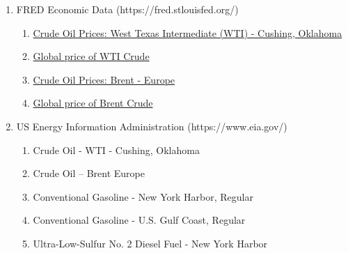 \documentclass[12pt,twoside]{article}
\begin{document}
\begin{justify}
{\fontsize{11pt}{13.2pt}\selectfont \par}
\end{justify}
\vspace{\baselineskip}\begin{enumerate}
	\item FRED Economic Data (https://fred.stlouisfed.org/)\par

\begin{enumerate}
	\item \href{https://fred.stlouisfed.org/series/DCOILWTICO}{Crude Oil Prices: West Texas Intermediate (WTI) - Cushing, Oklahoma}\par

	\item \href{https://fred.stlouisfed.org/series/POILWTIUSDM}{Global price of WTI Crude}\par

	\item \href{https://fred.stlouisfed.org/series/DCOILBRENTEU}{Crude Oil Prices: Brent - Europe}\par

	\item \href{https://fred.stlouisfed.org/series/POILBREUSDM}{Global price of Brent Crude}\par


\vspace{\baselineskip}

\end{enumerate}
	\item US Energy Information Administration (https://www.eia.gov/)\par

\begin{enumerate}
	\item Crude Oil - WTI - Cushing, Oklahoma\par

	\item Crude Oil – Brent Europe\par

	\item Conventional Gasoline - New York Harbor, Regular\par

	\item Conventional Gasoline - U.S. Gulf Coast, Regular\par

	\item Ultra-Low-Sulfur No. 2 Diesel Fuel - New York Harbor\par


\end{enumerate}
\end{enumerate}
\end{document}
